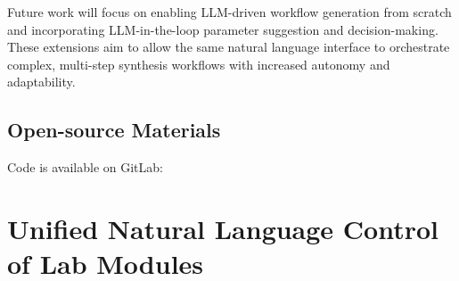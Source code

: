 Future work will focus on enabling LLM-driven workflow generation from scratch and incorporating LLM-in-the-loop parameter suggestion and decision-making. These extensions aim to allow the same natural language interface to orchestrate complex, multi-step synthesis workflows with increased autonomy and adaptability.


\subsection*{Open-source Materials}

Code is available on GitLab:  







\section{Unified Natural Language Control of Lab Modules}



